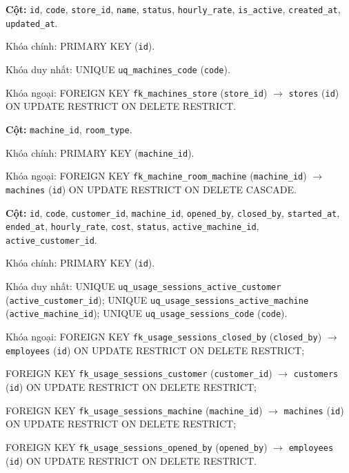 \begin{description}[leftmargin=3.6cm,labelwidth=3.4cm,style=nextline]

\item[\texttt{machines}] \textbf{Cột:} \texttt{id}, \texttt{code}, \texttt{store\_id}, \texttt{name}, \texttt{status}, \texttt{hourly\_rate}, \texttt{is\_active}, \texttt{created\_at}, \texttt{updated\_at}.

Khóa chính: PRIMARY KEY (\texttt{id}).

Khóa duy nhất: UNIQUE \texttt{uq\_machines\_code} (\texttt{code}).

Khóa ngoại: FOREIGN KEY \texttt{fk\_machines\_store} (\texttt{store\_id}) $\rightarrow$ \texttt{stores} (\texttt{id}) ON UPDATE RESTRICT ON DELETE RESTRICT.

\item[\texttt{machine\_room\_types}] \textbf{Cột:} \texttt{machine\_id}, \texttt{room\_type}.

Khóa chính: PRIMARY KEY (\texttt{machine\_id}).

Khóa ngoại: FOREIGN KEY \texttt{fk\_machine\_room\_machine} (\texttt{machine\_id}) $\rightarrow$ \texttt{machines} (\texttt{id}) ON UPDATE RESTRICT ON DELETE CASCADE.

\item[\texttt{usage\_sessions}] \textbf{Cột:} \texttt{id}, \texttt{code}, \texttt{customer\_id}, \texttt{machine\_id}, \texttt{opened\_by}, \texttt{closed\_by}, \texttt{started\_at}, \texttt{ended\_at}, \texttt{hourly\_rate}, \texttt{cost}, \texttt{status}, \texttt{active\_machine\_id}, \texttt{active\_customer\_id}.

Khóa chính: PRIMARY KEY (\texttt{id}).

Khóa duy nhất: UNIQUE \texttt{uq\_usage\_sessions\_active\_customer} (\texttt{active\_customer\_id}); UNIQUE \texttt{uq\_usage\_sessions\_active\_machine} (\texttt{active\_machine\_id}); UNIQUE \texttt{uq\_usage\_sessions\_code} (\texttt{code}).

Khóa ngoại: FOREIGN KEY \texttt{fk\_usage\_sessions\_closed\_by} (\texttt{closed\_by}) $\rightarrow$ \texttt{employees} (\texttt{id}) ON UPDATE RESTRICT ON DELETE RESTRICT;\par FOREIGN KEY \texttt{fk\_usage\_sessions\_customer} (\texttt{customer\_id}) $\rightarrow$ \texttt{customers} (\texttt{id}) ON UPDATE RESTRICT ON DELETE RESTRICT;\par FOREIGN KEY \texttt{fk\_usage\_sessions\_machine} (\texttt{machine\_id}) $\rightarrow$ \texttt{machines} (\texttt{id}) ON UPDATE RESTRICT ON DELETE RESTRICT;\par FOREIGN KEY \texttt{fk\_usage\_sessions\_opened\_by} (\texttt{opened\_by}) $\rightarrow$ \texttt{employees} (\texttt{id}) ON UPDATE RESTRICT ON DELETE RESTRICT.


\end{description}
